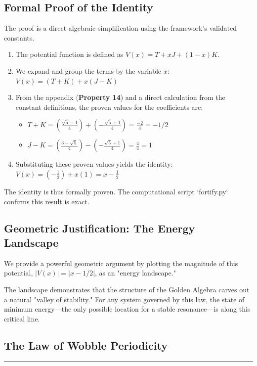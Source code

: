\subsection*{Formal Proof of the Identity}
The proof is a direct algebraic simplification using the framework's validated constants.
\begin{enumerate}
    \item The potential function is defined as $V(x) = T + xJ + (1-x)K$.
    \item We expand and group the terms by the variable $x$:
    $ V(x) = (T+K) + x(J-K) $
    \item From the appendix (\textbf{Property 14}) and a direct calculation from the constant definitions, the proven values for the coefficients are:
    \begin{itemize}
        \item $T+K = (\frac{\sqrt{5}-1}{4}) + (-\frac{\sqrt{5}+1}{4}) = \frac{-2}{4} = -1/2$
        \item $J-K = (\frac{3-\sqrt{5}}{4}) - (-\frac{\sqrt{5}+1}{4}) = \frac{4}{4} = 1$
    \end{itemize}
    \item Substituting these proven values yields the identity:
    $ V(x) = \left(-\frac{1}{2}\right) + x(1) = x - \frac{1}{2} $
\end{enumerate}
The identity is thus formally proven. The computational script `fortify.py` confirms this result is exact.

\subsection*{Geometric Justification: The Energy Landscape}
We provide a powerful geometric argument by plotting the magnitude of this potential, $|V(x)| = |x - 1/2|$, as an "energy landscape."

The landscape demonstrates that the structure of the Golden Algebra carves out a natural "valley of stability." For any system governed by this law, the state of minimum energy—the only possible location for a stable resonance—is along this critical line.


\subsection*{The Law of Wobble Periodicity}
\hrule
\vspace{0.3cm}
\vspace{0.5cm}

